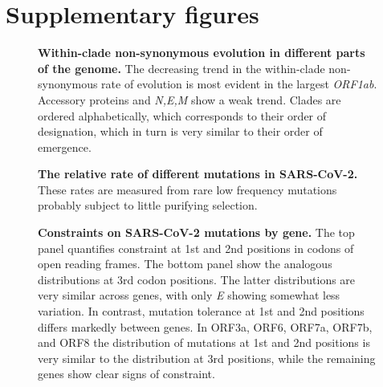 \section*{Supplementary figures}

\setcounter{figure}{0}
\renewcommand{\figurename}{Figure S}
\setcounter{table}{0}
\renewcommand{\tablename}{Table S}

\begin{figure}[h]
    \caption{{\bf Within-clade non-synonymous evolution in different parts of the genome.}
    The decreasing trend in the within-clade non-synonymous rate of evolution is most evident in the largest \emph{ORF1ab}.
    Accessory proteins and \emph{N,E,M} show a weak trend. Clades are ordered alphabetically, which corresponds to their order of designation, which in turn is very similar to their order of emergence.
    \label{fig:rate_progression_by_gene}}
\end{figure}

\begin{figure}[h]
    \caption{{\bf The relative rate of different mutations in SARS-CoV-2.}
    These rates are measured from rare low frequency mutations probably subject to little purifying selection.
    \label{fig:mutation_distribution}}
\end{figure}

\begin{figure}[h]
    \caption{{\bf Constraints on SARS-CoV-2 mutations by gene.}
    The top panel quantifies constraint at 1st and 2nd positions in codons of open reading frames.
    The bottom panel show the analogous distributions at 3rd codon positions.
    The latter distributions are very similar across genes, with only \emph{E} showing somewhat less variation.
    In contrast, mutation tolerance at 1st and 2nd positions differs markedly between genes.
    In ORF3a, ORF6, ORF7a, ORF7b, and ORF8 the distribution of mutations at 1st and 2nd positions is very similar to the distribution at 3rd positions, while the remaining genes show clear signs of constraint.
    \label{fig:fitness_costs_supp}}
 \end{figure}

